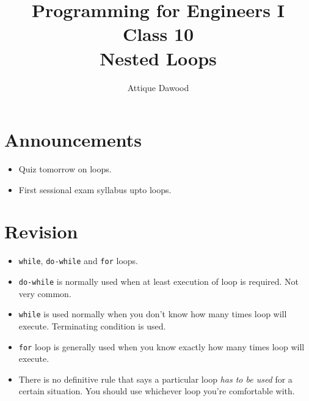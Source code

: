 \documentclass[12pt,a4paper]{article}
\title{\vspace{-2cm}Programming for Engineers I\\Class 10\\Nested Loops}
\author{Attique Dawood}
\begin{document}
\maketitle
\section{Announcements}
\begin{itemize}
\item Quiz tomorrow on loops.
\item First sessional exam syllabus upto loops.
\end{itemize}
\section{Revision}
\begin{itemize}
\item \verb|while|, \verb|do-while| and \verb|for| loops.
\item \verb|do-while| is normally used when at least execution of loop is required. Not very common.
\item \verb|while| is used normally when you don't know how many times loop will execute. Terminating condition is used.
\item \verb|for| loop is generally used when you know exactly how many times loop will execute.
\item There is no definitive rule that says a particular loop \emph{has to be used} for a certain situation. You should use whichever loop you're comfortable with.
\end{itemize}
\end{document}
